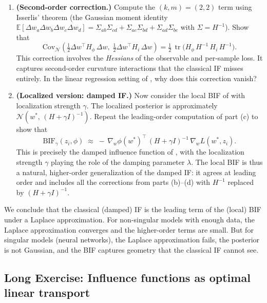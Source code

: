 \documentclass[11pt]{article}
\newcommand{\E}{\mathbb{E}}
\DeclareMathOperator{\tr}{tr}
\begin{document}
\begin{exercise}
\begin{enumerate}
  \item \textbf{(Second-order correction.)} Compute the $(k,m) = (2,2)$ term using Isserlis' theorem (the Gaussian moment identity $\E[\Delta w_a\Delta w_b\Delta w_c\Delta w_d] = \Sigma_{ab}\Sigma_{cd} + \Sigma_{ac}\Sigma_{bd} + \Sigma_{ad}\Sigma_{bc}$ with $\Sigma = H^{-1}$). Show that
  \[
    \mathrm{Cov}_{\mathcal{N}}\!\left(\tfrac{1}{2}\Delta w^\top H_\phi\,\Delta w,\;\tfrac{1}{2}\Delta w^\top H_i\,\Delta w\right) = \tfrac{1}{2}\,\tr\bigl(H_\phi\,H^{-1}\,H_i\,H^{-1}\bigr).
  \]
  This correction involves the \emph{Hessians} of the observable and per-sample loss. It captures second-order curvature interactions that the classical IF misses entirely. In the linear regression setting of , why does this correction vanish?

  \item \textbf{(Localized version: damped IF.)} Now consider the local BIF of  with localization strength $\gamma$. The localized posterior is approximately $\mathcal{N}(w^*,\,(H+\gamma I)^{-1})$. Repeat the leading-order computation of part (c) to show that
  \[
    \mathrm{BIF}_\gamma(z_i,\phi) \;\approx\; -\,\nabla_w\phi(w^*)^\top\,(H + \gamma I)^{-1}\,\nabla_w L(w^*,z_i).
  \]
  This is precisely the damped influence function of , with the localization strength $\gamma$ playing the role of the damping parameter $\lambda$. The local BIF is thus a natural, higher-order generalization of the damped IF: it agrees at leading order and includes all the corrections from parts (b)--(d) with $H^{-1}$ replaced by $(H + \gamma I)^{-1}$.

\end{enumerate}
\end{exercise}
\begin{remark}
    We conclude that the classical (damped) IF is the leading term of the (local) BIF under a Laplace approximation. For non-singular models with enough data, the Laplace approximation converges and the higher-order terms are small. But for singular models (neural networks), the Laplace approximation fails, the posterior is not Gaussian, and the BIF captures geometry that the classical IF cannot see.
\end{remark}
\subsection{Long Exercise: Influence functions as optimal linear transport}\label{subsec:bif-ot}
\end{document}
